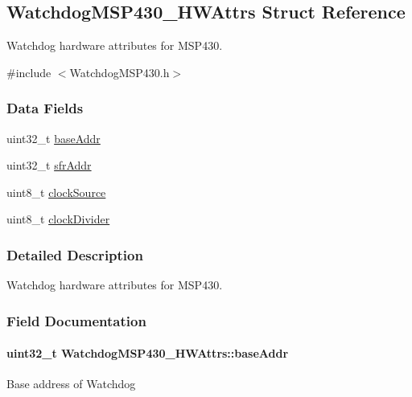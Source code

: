 \subsection{Watchdog\+M\+S\+P430\+\_\+\+H\+W\+Attrs Struct Reference}
\label{struct_watchdog_m_s_p430___h_w_attrs}


Watchdog hardware attributes for M\+S\+P430.  




{\ttfamily \#include $<$Watchdog\+M\+S\+P430.\+h$>$}

\subsubsection*{Data Fields}
\begin{DoxyCompactItemize}
\item 
uint32\+\_\+t \hyperlink{struct_watchdog_m_s_p430___h_w_attrs_a7a54ffaf26e1afc7ea3c1c65b1e24262}{base\+Addr}
\item 
uint32\+\_\+t \hyperlink{struct_watchdog_m_s_p430___h_w_attrs_a763f95534b160827a7c199ddab02a6b9}{sfr\+Addr}
\item 
uint8\+\_\+t \hyperlink{struct_watchdog_m_s_p430___h_w_attrs_a7b0d9bd3ef04e58530c19312621b05a2}{clock\+Source}
\item 
uint8\+\_\+t \hyperlink{struct_watchdog_m_s_p430___h_w_attrs_a405ce3d2556166a841de62f207ce8675}{clock\+Divider}
\end{DoxyCompactItemize}


\subsubsection{Detailed Description}
Watchdog hardware attributes for M\+S\+P430. 

\subsubsection{Field Documentation}
\paragraph[{base\+Addr}]{\setlength{\rightskip}{0pt plus 5cm}uint32\+\_\+t Watchdog\+M\+S\+P430\+\_\+\+H\+W\+Attrs\+::base\+Addr}\label{struct_watchdog_m_s_p430___h_w_attrs_a7a54ffaf26e1afc7ea3c1c65b1e24262}
Base address of Watchdog 
